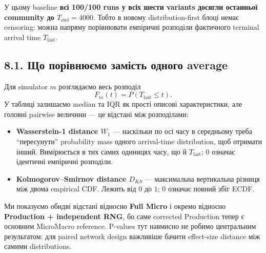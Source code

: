 \documentclass[11pt,a4paper]{article}
\begin{document}
У цьому baseline \textbf{всі 100/100 runs у всіх шести variants досягли останньої community до $T_{\mathrm{end}}=4000$}. Тобто в новому distribution-first блоці немає censoring: можна напряму порівнювати емпіричні розподіли фактичного terminal arrival time $T_{\mathrm{last}}$.

\subsection*{8.1. Що порівнюємо замість одного average}

Для simulator $m$ розглядаємо весь розподіл
\[
F_m(t)=P\!\left(T_{\mathrm{last}}\le t\right).
\]
У таблиці залишаємо median та IQR як прості описові характеристики, але головні pairwise величини --- це відстані між розподілами:
\begin{itemize}[nosep]
\item \textbf{Wasserstein-1 distance $W_1$} --- наскільки по осі часу в середньому треба ``пересунути'' probability mass одного arrival-time distribution, щоб отримати інший. Вимірюється в тих самих одиницях часу, що й $T_{\mathrm{last}}$; $0$ означає ідентичні емпіричні розподіли.
\item \textbf{Kolmogorov--Smirnov distance $D_{KS}$} --- максимальна вертикальна різниця між двома empirical CDF. Лежить від $0$ до $1$; $0$ означає повний збіг ECDF.
\end{itemize}
Ми показуємо обидві відстані відносно \textbf{Full Micro} і окремо відносно \textbf{Production + independent RNG}, бо саме corrected Production тепер є основним MicroMacro reference. P-values тут навмисно не робимо центральним результатом: для paired network design важливіше бачити effect-size distance між самими distributions.
\end{document}
